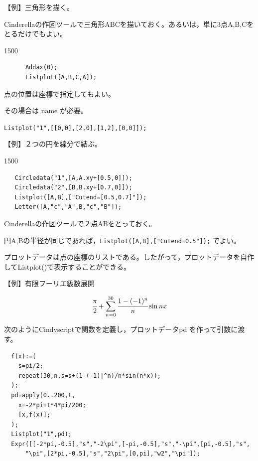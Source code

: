 \documentclass[papersize,a4paper,12pt,uplatex]{jsarticle}
\begin{document}
\begin{description}
【例】三角形を描く。

  Cinderellaの作図ツールで三角形ABCを描いておく。あるいは，単に3点A,B,Cをとるだけでもよい。

\begin{layer}{150}{0}
\end{layer}
\hspace{20mm}

\begin{verbatim}
      Addax(0);
      Listplot([A,B,C,A]);
\end{verbatim}

点の位置は座標で指定してもよい。

その場合は name が必要。

\hspace{10mm} \verb|Listplot("1",[[0,0],[2,0],[1,2],[0,0]]);|

\vspace{\baselineskip}
【例】２つの円を線分で結ぶ。
  
\begin{layer}{150}{0}
\end{layer}
\hspace{20mm}

\begin{verbatim}
   Circledata("1",[A,A.xy+[0.5,0]]);
   Circledata("2",[B,B.xy+[0.7,0]]);
   Listplot([A,B],["Cutend=[0.5,0.7]"]);
   Letter([A,"c","A",B,"c","B"]);
\end{verbatim}
  Cinderellaの作図ツールで２点ABをとっておく。

円A,Bの半径が同じであれば，\verb|Listplot([A,B],["Cutend=0.5"]);| でよい。

\vspace{\baselineskip}
プロットデータは点の座標のリストである。したがって，プロットデータを自作してListplot()で表示することができる。

\vspace{\baselineskip}
【例】有限フーリエ級数展開

           \[\cfrac{\pi}{2}+\sum_{n=0}^{30} \cfrac{1-(-1)^n}{n}\sin nx\]

次のようにCindyscriptで関数を定義し，プロットデータpd を作って引数に渡す。
\begin{verbatim}
  f(x):=(
    s=pi/2;
    repeat(30,n,s=s+(1-(-1)|^n)/n*sin(n*x));
  );
  pd=apply(0..200,t,
    x=-2*pi+t*4*pi/200;
    [x,f(x)];
  );
  Listplot("1",pd);
  Expr([[-2*pi,-0.5],"s","-2\pi",[-pi,-0.5],"s","-\pi",[pi,-0.5],"s",
      "\pi",[2*pi,-0.5],"s","2\pi",[0,pi],"w2","\pi"]);
\end{verbatim}


\end{description}
\end{document}
